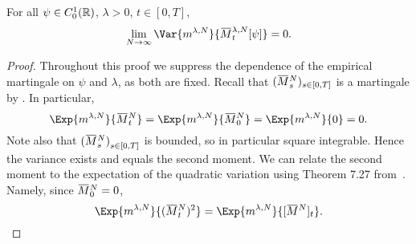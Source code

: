 \begin{proposition}\label{prop:vanishing-variance}  %
  For all \(\psi \in C_0^1(\mathbb{R})\), \(\lambda > 0\), \(t \in [0,T]\),
  \begin{equation}
    \lim_{N\to\infty} \Var{\lawmu^{\lambda,N}}{\ol{M}_t^{\lambda,N}[\psi]} = 0.
  \end{equation}
\end{proposition}
\begin{proof}
  Throughout this proof we suppress the dependence of the empirical martingale on \( \psi \) and \( \lambda \), as both are fixed.
  Recall that \((\ol{M}_s^N)_{s\in[0,T]}\) is a martingale by .
  In particular,
  \begin{equation}
    \Exp{\lawmu^{\lambda,N}}{\ol{M}_t^N} = \Exp{\lawmu^{\lambda,N}}{\ol{M}_0^N}
    = \Exp{\lawmu^{\lambda,N}}{0} = 0.    %
  \end{equation}
  Note also that \({(\ol{M}_s^N)}_{s\in[0,T]}\) is bounded, so in particular square integrable.
  Hence the variance exists and equals the second moment.
  We can relate the second moment to the expectation of the quadratic variation using Theorem 7.27 from~\cite[201]{klebanerIntroductionStochasticCalculus2012}.
  Namely, since \(\ol{M}_0^N = 0\),
  \begin{equation}
    \Exp{\lawmu^{\lambda,N}}{(\ol{M}_t^N)^2} = \Exp{\lawmu^{\lambda,N}}{\sbr{\ol{M}^N}_t}.
  \end{equation}


\end{proof}
